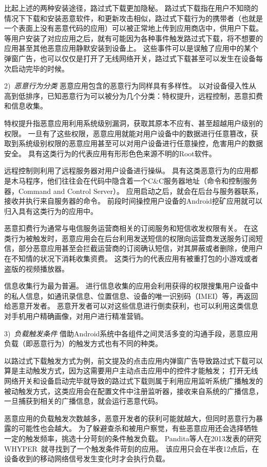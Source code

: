比起上述的两种安装途径，路过式下载更加隐秘。
路过式下载指在用户不知晓的情况下下载和安装恶意软件，和更新攻击相似，路过式下载行为的携带者（也就是一个表面上没有恶意代码的应用）可以被正常地上传到应用商店中，供用户下载。
等用户安装了对应应用之后，就有可能因为各种事件触发路过式下载，将不想要的应用甚至其他恶意应用静默安装到设备上。
这些事件可以是误触了应用中的某个弹窗广告，也可以仅仅是打开了无线网络开关，路过式下载甚至可以发生在设备每次启动完毕的时候。

2)\ \emph{恶意行为分类} \quad
恶意应用包含的恶意行为同样具有多样性。
以对设备侵入性从高到低排序，已知恶意行为可以被分为几个分类：特权提升，远程控制，恶意扣费和信息收集。

特权提升指恶意应用利用系统级别漏洞，获取其原本不应有、甚至超越用户级别的权限。
一旦有了这些权限，恶意应用就能对用户设备中的数据进行任意篡改，获取到系统级别权限的恶意应用甚至可以对用户设备进行任意操控，危害用户的数据安全。
具有这类行为的代表应用有形形色色来源不明的Root软件。

远程控制则利用了远程服务器对用户设备进行操纵。
具有这类恶意行为的应用都是木马程序，他们往往会在代码中隐含着一个C\&C服务器地址（命令和控制服务器，Command and Control Server）。
应用启动之后，就会在后台与服务器联系，接收并执行来自服务器的命令。
前段时间操控用户设备的Android挖矿应用就可以归入具有这类行为的应用中。

恶意扣费行为通常与电信服务运营商相关的订阅服务和短信收发权限有关。
在这类行为被触发时，恶意应用会在后台利用发送短信的权限向运营商发送服务订阅短信，部分恶意应用甚至会拦截运营商的订阅确认短信，对其屏蔽或者删除，使用户在不知情的状况下消耗收集资费。
这类行为的代表应用有被重打包的小游戏或者盗版的视频播放器。

信息收集行为最为普遍。
进行信息收集的应用会利用获得的权限搜集用户设备中的私人信息，如通讯录信息、位置信息、设备的唯一识别码（IMEI）等，再返回给恶意开发者。
恶意开发者可以对这些信息进行倒卖获利，也可以利用这类信息对手机用户精确画像，对用户进行精准营销。

3)\ \emph{负载触发条件} \quad
借助Android系统中各组件之间灵活多变的沟通手段，恶意应用负载（即恶意行为）的触发方式也有不同的种类。

以路过式下载触发方式为例，前文提及的点击应用内弹窗广告导致路过式下载可以算是主动触发方式，因为这需要用户主动点击应用中的控件才能触发；
打开无线网络开关和设备启动完毕就导致的路过式下载则属于利用应用监听系统广播触发的被动触发方式，这类应用会在配置文件中注册监听器，接收来自系统的广播信息，一旦捕获到相关的广播信息，就会运行恶意代码。

恶意应用的负载触发次数越多，恶意开发者的获利可能就越大，但同时恶意行为暴露的可能性也会越大。
为了躲避查杀和被用户察觉，有些恶意应用还会选择牺牲一定的触发频率，挑选十分苛刻的条件触发负载。
Pandita等人在2013发表的研究WHYPER~\cite{pandita2013whyper}就寻找到了一个触发条件苛刻的应用。
该应用只会在半夜12点后，在设备收到的移动网络信号发生变化时才会执行负载。

